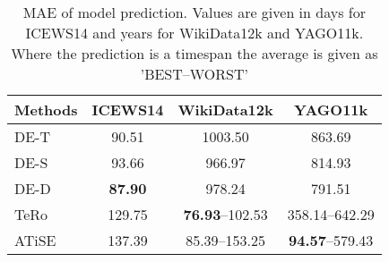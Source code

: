 \begin{table}[htb]
\centering
\begin{minipage}{0.95\columnwidth}
\centering
\caption{MAE of model prediction. Values are given in days for ICEWS14 and years for WikiData12k and YAGO11k. Where the prediction is a timespan the average is given as '\textsc{BEST}–\textsc{WORST}'}
\vspace{-3mm}

\begin{tabular}{lccc}
\hline
Methods & ICEWS14 & WikiData12k & YAGO11k\\
\hline
DE-T & 90.51 & 1003.50 & 863.69\\
DE-S & 93.66 & 966.97 & 814.93\\
DE-D & \textbf{87.90} & 978.24 & 791.51\\
TeRo & 129.75 & \textbf{76.93}–102.53 & 358.14–642.29\\
ATiSE & 137.39 & 85.39–153.25 & \textbf{94.57}–579.43\\
\hline
\end{tabular}


\label{tab:time_prediction_mae}
\end{minipage}
\end{table}